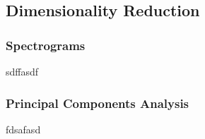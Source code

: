 \subsection{Dimensionality Reduction}
\subsubsection{Spectrograms}
	sdffasdf
\subsubsection{Principal Components Analysis}
	fdsafasd